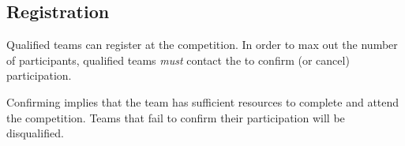 \subsection{Registration}
\label{sec:rules:registration}
Qualified teams can register at the \RoboCup\AtHome{} competition. In order to max out the number of participants, qualified teams \emph{must} contact the \OC{} to confirm (or cancel) participation.

Confirming implies that the team has sufficient resources to complete \Registration{} and attend the competition. Teams that fail to confirm their participation will be disqualified.



